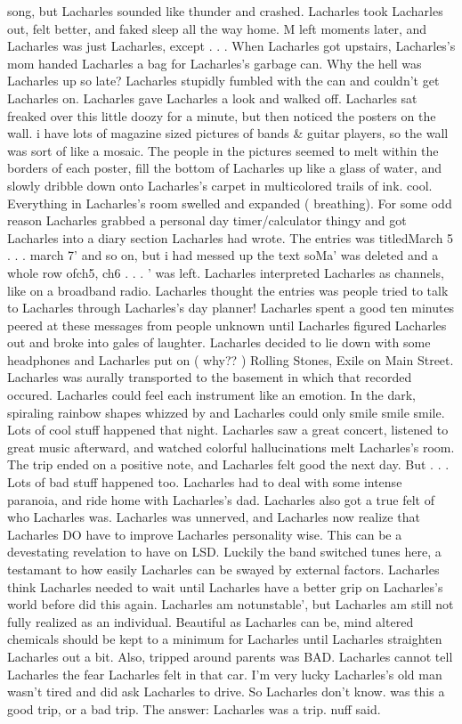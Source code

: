 \documentclass[12pt]{book}
\begin{document}
song, but Lacharles sounded like thunder and crashed. Lacharles took Lacharles out, felt better, and faked sleep all the way home. M left moments later, and Lacharles was just Lacharles, except . . .  When Lacharles got upstairs, Lacharles's mom handed Lacharles a bag for Lacharles's garbage can. Why the hell was Lacharles up so late? Lacharles stupidly fumbled with the can and couldn't get Lacharles on. Lacharles gave Lacharles a look and walked off. Lacharles sat freaked over this little doozy for a minute, but then noticed the posters on the wall. i have lots of magazine sized pictures of bands \& guitar players, so the wall was sort of like a mosaic. The people in the pictures seemed to melt within the borders of each poster, fill the bottom of Lacharles up like a glass of water, and slowly dribble down onto Lacharles's carpet in multicolored trails of ink. cool. Everything in Lacharles's room swelled and expanded ( breathing). For some odd reason Lacharles grabbed a personal day timer/calculator thingy and got Lacharles into a diary section Lacharles had wrote. The entries was titledMarch 5 . . .  march 7' and so on, but i had messed up the text soMa' was deleted and a whole row ofch5, ch6 . . .  ' was left. Lacharles interpreted Lacharles as channels, like on a broadband radio. Lacharles thought the entries was people tried to talk to Lacharles through Lacharles's day planner! Lacharles spent a good ten minutes peered at these messages from people unknown until Lacharles figured Lacharles out and broke into gales of laughter. Lacharles decided to lie down with some headphones and Lacharles put on ( why?? ) Rolling Stones, Exile on Main Street. Lacharles was aurally transported to the basement in which that recorded occured. Lacharles could feel each instrument like an emotion. In the dark, spiraling rainbow shapes whizzed by and Lacharles could only smile smile smile. Lots of cool stuff happened that night. Lacharles saw a great concert, listened to great music afterward, and watched colorful hallucinations melt Lacharles's room. The trip ended on a positive note, and Lacharles felt good the next day. But . . .  Lots of bad stuff happened too. Lacharles had to deal with some intense paranoia, and ride home with Lacharles's dad. Lacharles also got a true felt of who Lacharles was. Lacharles was unnerved, and Lacharles now realize that Lacharles DO have to improve Lacharles personality wise. This can be a devestating revelation to have on LSD. Luckily the band switched tunes here, a testamant to how easily Lacharles can be swayed by external factors. Lacharles think Lacharles needed to wait until Lacharles have a better grip on Lacharles's world before did this again. Lacharles am notunstable', but Lacharles am still not fully realized as an individual. Beautiful as Lacharles can be, mind altered chemicals should be kept to a minimum for Lacharles until Lacharles straighten Lacharles out a bit. Also, tripped around parents was BAD. Lacharles cannot tell Lacharles the fear Lacharles felt in that car. I'm very lucky Lacharles's old man wasn't tired and did ask Lacharles to drive. So Lacharles don't know. was this a good trip, or a bad trip. The answer: Lacharles was a trip. nuff said.
\end{document}

